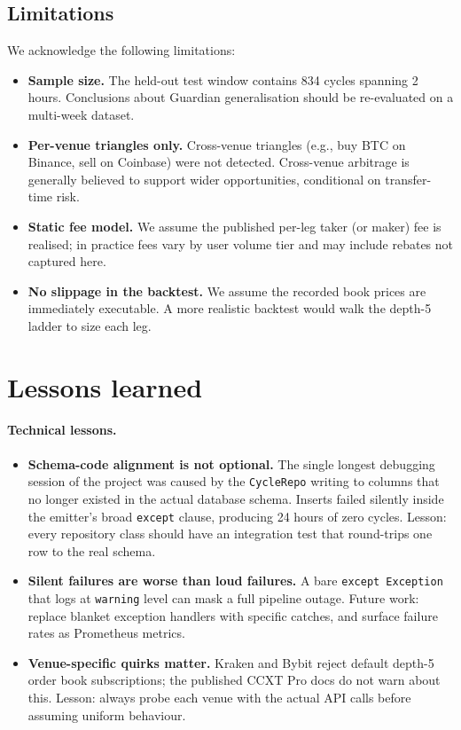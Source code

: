 \documentclass[11pt,a4paper]{article}
\begin{document}
\subsection{Limitations}
We acknowledge the following limitations:
\begin{itemize}
    \item \textbf{Sample size.} The held-out test window contains 834 cycles spanning 2 hours. Conclusions about Guardian generalisation should be re-evaluated on a multi-week dataset.
    \item \textbf{Per-venue triangles only.} Cross-venue triangles (e.g., buy BTC on Binance, sell on Coinbase) were not detected. Cross-venue arbitrage is generally believed to support wider opportunities, conditional on transfer-time risk.
    \item \textbf{Static fee model.} We assume the published per-leg taker (or maker) fee is realised; in practice fees vary by user volume tier and may include rebates not captured here.
    \item \textbf{No slippage in the backtest.} We assume the recorded book prices are immediately executable. A more realistic backtest would walk the depth-5 ladder to size each leg.
\end{itemize}


\section*{Lessons learned}

\paragraph{Technical lessons.}
\begin{itemize}
    \item \textbf{Schema-code alignment is not optional.} The single longest debugging
          session of the project was caused by the \texttt{CycleRepo} writing to
          columns that no longer existed in the actual database schema. Inserts
          failed silently inside the emitter's broad \texttt{except} clause, producing
          24 hours of zero cycles. Lesson: every repository class should have
          an integration test that round-trips one row to the real schema.
    \item \textbf{Silent failures are worse than loud failures.} A bare
          \texttt{except Exception} that logs at \texttt{warning} level can mask a
          full pipeline outage. Future work: replace blanket exception handlers
          with specific catches, and surface failure rates as Prometheus metrics.
    \item \textbf{Venue-specific quirks matter.} Kraken and Bybit reject default
          depth-5 order book subscriptions; the published CCXT Pro docs do not
          warn about this. Lesson: always probe each venue with the actual API
          calls before assuming uniform behaviour.
\end{itemize}
\end{document}
